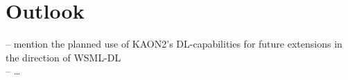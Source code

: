 \section{Outlook\label{sec:outlook}}
-- mention the planned use of KAON2's DL-capabilities for future extensions in the direction of WSML-DL \\
-- \dots
